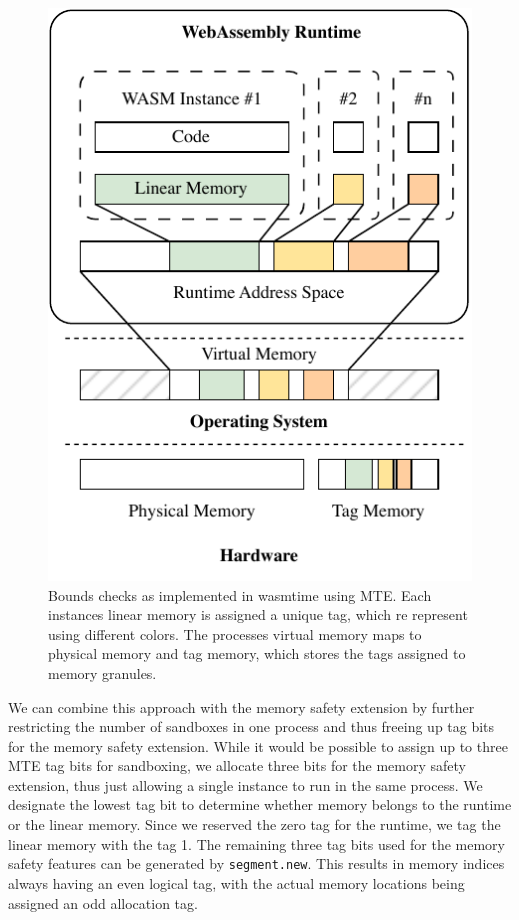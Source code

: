 \begin{figure}[t]
    \centering
    \includegraphics[scale=1]{figures/build/system-design-1}
    \caption{Bounds checks as implemented in wasmtime using \ac{MTE}. Each instances linear memory is assigned a unique tag, which re represent using different colors. The processes virtual memory maps to physical memory and tag memory, which stores the tags assigned to memory granules.}
    \label{fig:system-design-sandboxing}
\end{figure}

We can combine this approach with the memory safety extension by further restricting the number of sandboxes in one process and thus freeing up tag bits for the memory safety extension.
While it would be possible to assign up to three \ac{MTE} tag bits for sandboxing, we allocate three bits for the memory safety extension, thus just allowing a single instance to run in the same process.
We designate the lowest tag bit to determine whether memory belongs to the runtime or the linear memory.
Since we reserved the zero tag for the runtime, we tag the linear memory with the tag 1.
The remaining three tag bits used for the memory safety features can be generated by \texttt{segment.new}.
This results in memory indices always having an even logical tag, with the actual memory locations being assigned an odd allocation tag.

